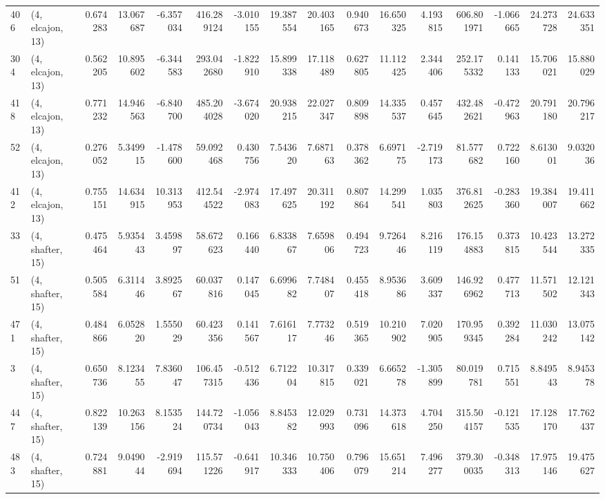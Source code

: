 \begin{tabular}{llrrrrrrrrrrrrrr}
406 &  (4, elcajon, 13) &   0.674283 &  13.067687 &  -6.357034 &   416.289124 &  -3.010155 &  19.387554 &  20.403165 &  0.940673 &  16.650325 &   4.193815 &   606.801971 & -1.066665 &  24.273728 &  24.633351 \\
304 &  (4, elcajon, 13) &   0.562205 &  10.895602 &  -6.344583 &   293.042680 &  -1.822910 &  15.899338 &  17.118489 &  0.627805 &  11.112425 &   2.344406 &   252.175332 &  0.141133 &  15.706021 &  15.880029 \\
418 &  (4, elcajon, 13) &   0.771232 &  14.946563 &  -6.840700 &   485.204028 &  -3.674020 &  20.938215 &  22.027347 &  0.809898 &  14.335537 &   0.457645 &   432.482621 & -0.472963 &  20.791180 &  20.796217 \\
52  &  (4, elcajon, 13) &   0.276052 &   5.349915 &  -1.478600 &    59.092468 &   0.430756 &   7.543620 &   7.687163 &  0.378362 &   6.697175 &  -2.719173 &    81.577682 &  0.722160 &   8.613001 &   9.032036 \\
412 &  (4, elcajon, 13) &   0.755151 &  14.634915 &  10.313953 &   412.544522 &  -2.974083 &  17.497625 &  20.311192 &  0.807864 &  14.299541 &   1.035803 &   376.812625 & -0.283360 &  19.384007 &  19.411662 \\
33  &  (4, shafter, 15) &   0.475464 &   5.935443 &   3.459897 &    58.672623 &   0.166440 &   6.833867 &   7.659806 &  0.494723 &   9.726446 &   8.216119 &   176.154883 &  0.373815 &  10.423544 &  13.272335 \\
51  &  (4, shafter, 15) &   0.505584 &   6.311446 &   3.892567 &    60.037816 &   0.147045 &   6.699682 &   7.748407 &  0.455418 &   8.953686 &   3.609337 &   146.926962 &  0.477713 &  11.571502 &  12.121343 \\
471 &  (4, shafter, 15) &   0.484866 &   6.052820 &   1.555029 &    60.423356 &   0.141567 &   7.616117 &   7.773246 &  0.519365 &  10.210902 &   7.020905 &   170.959345 &  0.392284 &  11.030242 &  13.075142 \\
3   &  (4, shafter, 15) &   0.650736 &   8.123455 &   7.836047 &   106.457315 &  -0.512436 &   6.712204 &  10.317815 &  0.339021 &   6.665278 &  -1.305899 &    80.019781 &  0.715551 &   8.849543 &   8.945378 \\
447 &  (4, shafter, 15) &   0.822139 &  10.263156 &   8.153524 &   144.720734 &  -1.056043 &   8.845382 &  12.029993 &  0.731096 &  14.373618 &   4.704250 &   315.504157 & -0.121535 &  17.128170 &  17.762437 \\
483 &  (4, shafter, 15) &   0.724881 &   9.049044 &  -2.919694 &   115.571226 &  -0.641917 &  10.346333 &  10.750406 &  0.796079 &  15.651214 &   7.496277 &   379.300035 & -0.348313 &  17.975146 &  19.475627 \\

\end{tabular}
